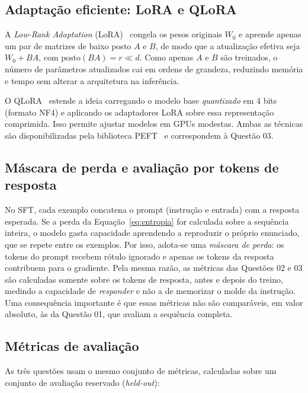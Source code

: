 \subsection{Adaptação eficiente: LoRA e QLoRA}

A \textit{Low-Rank Adaptation} (LoRA)~\cite{hu2022lora} congela os pesos originais
$W_0$ e aprende apenas um par de matrizes de baixo posto $A$ e $B$, de modo que a
atualização efetiva seja $W_0 + BA$, com $\mathrm{posto}(BA) = r \ll d$. Como apenas
$A$ e $B$ são treinados, o número de parâmetros atualizados cai em ordens de
grandeza, reduzindo memória e tempo sem alterar a arquitetura na inferência.

O QLoRA~\cite{dettmers2023qlora} estende a ideia carregando o modelo base
\emph{quantizado} em 4 bits (formato NF4) e aplicando os adaptadores LoRA sobre essa
representação comprimida. Isso permite ajustar modelos em GPUs modestas. Ambas as
técnicas são disponibilizadas pela biblioteca PEFT~\cite{peft2022} e correspondem à
Questão 03.

\subsection{Máscara de perda e avaliação por tokens de resposta}
\label{sec:mascara}

No SFT, cada exemplo concatena o prompt (instrução e entrada) com a resposta
esperada. Se a perda da Equação~\ref{eq:entropia} for calculada sobre a sequência
inteira, o modelo gasta capacidade aprendendo a reproduzir o próprio enunciado, que
se repete entre os exemplos. Por isso, adota-se uma \emph{máscara de perda}: os
tokens do prompt recebem rótulo ignorado e apenas os tokens da resposta contribuem
para o gradiente. Pela mesma razão, as métricas das Questões 02 e 03 são calculadas
somente sobre os tokens de resposta, antes e depois do treino, medindo a capacidade
de \emph{responder} e não a de memorizar o molde da instrução. Uma consequência
importante é que essas métricas não são comparáveis, em valor absoluto, às da
Questão 01, que avaliam a sequência completa.

\subsection{Métricas de avaliação}
\label{sec:metricas}

As três questões usam o mesmo conjunto de métricas, calculadas sobre um conjunto de
avaliação reservado (\textit{held-out}):

